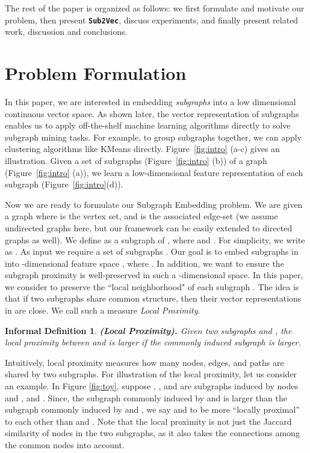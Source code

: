 \documentclass[sigconf]{acmart}
\newcommand{\alg}{{\bf {\tt Sub2Vec}}\xspace}
\newtheorem{informaldefinition}{Informal Definition}
\begin{document}
 The rest of the paper is organized as follows: we first formulate and motivate our problem, then present \alg, discuss experiments, and finally present related work, discussion and conclusions. 


\section{Problem Formulation}
\label{sec:prob}

In this paper, we are interested in embedding \emph{subgraphs} into a low dimensional continuous vector space. As shown later, the vector representation of subgraphs enables us to apply off-the-shelf machine learning algorithms directly to solve subgraph mining tasks. For example, to group subgraphs together, we can apply clustering algorithms like KMeans directly. Figure~\ref{fig:intro} (a-c) gives an illustration. Given a set of subgraphs (Figure~\ref{fig:intro} (b)) of a graph  (Figure~\ref{fig:intro} (a)), we learn  a low-dimensional feature representation of each subgraph (Figure~\ref{fig:intro}(d)).


Now we are ready to formulate  our Subgraph Embedding problem. We are given a graph  where  is the vertex set, and  is the associated edge-set (we assume undirected graphs here, but our framework can be easily extended to directed graphs as well). We define  as a subgraph of , where  and . For simplicity, we write  as . As input we require a set of subgraphs  . Our goal is to embed  subgraphs in  into -dimensional feature space , where . In addition, we want to ensure the subgraph proximity is well-preserved in such a -dimensional space.  
In this paper, we consider to preserve the ``local neighborhood" of each subgraph . The idea is that if two subgraphs share common structure, then their vector representations in  are close. We call such a measure \emph{Local Proximity}.  

\begin{informaldefinition}\textbf{(Local Proximity).} Given two subgraphs  and , the local proximity between  and   is larger if the commonly induced subgraph is larger. 
\end{informaldefinition}

Intuitively, local proximity measures how many nodes, edges, and paths are shared by two subgraphs. For illustration of the local proximity, let us consider an example. In Figure \ref{fig:toy}, suppose , , and  are subgraphs induced  by nodes  and , and . Since, the subgraph commonly induced by  and  is larger than the subgraph commonly induced by  and , we say  and  to be more ``locally proximal'' to each other than  and . Note that the local proximity is not just the Jaccard similarity of nodes in the two subgraphs, as it also takes the connections among the common nodes into account.
\end{document}
